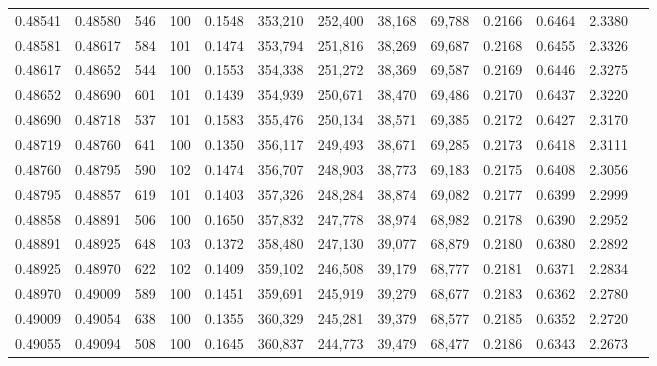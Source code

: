 \begin{tabular}{rrrrrrrrrrrrr}
0.48541 & 0.48580 &   546 & 100 &                                     0.1548 & 353,210 & 252,400 &  38,168 &  69,788 & 0.2166 & 0.6464 & 2.3380 \\
0.48581 & 0.48617 &   584 & 101 &                                     0.1474 & 353,794 & 251,816 &  38,269 &  69,687 & 0.2168 & 0.6455 & 2.3326 \\
0.48617 & 0.48652 &   544 & 100 &                                     0.1553 & 354,338 & 251,272 &  38,369 &  69,587 & 0.2169 & 0.6446 & 2.3275 \\
0.48652 & 0.48690 &   601 & 101 &                                     0.1439 & 354,939 & 250,671 &  38,470 &  69,486 & 0.2170 & 0.6437 & 2.3220 \\
0.48690 & 0.48718 &   537 & 101 &                                     0.1583 & 355,476 & 250,134 &  38,571 &  69,385 & 0.2172 & 0.6427 & 2.3170 \\
0.48719 & 0.48760 &   641 & 100 &                                     0.1350 & 356,117 & 249,493 &  38,671 &  69,285 & 0.2173 & 0.6418 & 2.3111 \\
0.48760 & 0.48795 &   590 & 102 &                                     0.1474 & 356,707 & 248,903 &  38,773 &  69,183 & 0.2175 & 0.6408 & 2.3056 \\
0.48795 & 0.48857 &   619 & 101 &                                     0.1403 & 357,326 & 248,284 &  38,874 &  69,082 & 0.2177 & 0.6399 & 2.2999 \\
0.48858 & 0.48891 &   506 & 100 &                                     0.1650 & 357,832 & 247,778 &  38,974 &  68,982 & 0.2178 & 0.6390 & 2.2952 \\
0.48891 & 0.48925 &   648 & 103 &                                     0.1372 & 358,480 & 247,130 &  39,077 &  68,879 & 0.2180 & 0.6380 & 2.2892 \\
0.48925 & 0.48970 &   622 & 102 &                                     0.1409 & 359,102 & 246,508 &  39,179 &  68,777 & 0.2181 & 0.6371 & 2.2834 \\
0.48970 & 0.49009 &   589 & 100 &                                     0.1451 & 359,691 & 245,919 &  39,279 &  68,677 & 0.2183 & 0.6362 & 2.2780 \\
0.49009 & 0.49054 &   638 & 100 &                                     0.1355 & 360,329 & 245,281 &  39,379 &  68,577 & 0.2185 & 0.6352 & 2.2720 \\
0.49055 & 0.49094 &   508 & 100 &                                     0.1645 & 360,837 & 244,773 &  39,479 &  68,477 & 0.2186 & 0.6343 & 2.2673 \\

\end{tabular}

